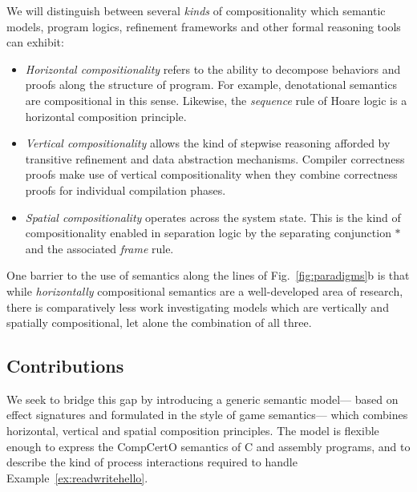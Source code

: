 \documentclass[acmsmall,nonacm]{acmart}
\begin{document}
We will distinguish between several \emph{kinds} of compositionality which
semantic models, program logics, refinement frameworks
and other formal reasoning tools
can exhibit:
\begin{itemize}
\item \emph{Horizontal compositionality}
  refers to the ability to decompose behaviors and proofs
  along the structure of program.
  For example, denotational semantics are compositional in this sense.
  Likewise,
  the \emph{sequence} rule of Hoare logic
  is a horizontal composition principle.
\item \emph{Vertical compositionality} allows
  the kind of stepwise reasoning afforded by
  transitive refinement and data abstraction mechanisms.
  Compiler correctness proofs make use of vertical compositionality
  when they combine correctness proofs for individual compilation phases.
\item \emph{Spatial compositionality} operates across the system state.
  This is the kind of compositionality enabled in separation logic
  by the separating conjunction $\ast$
  and the associated \emph{frame} rule.
\end{itemize}
One barrier to the use of semantics
along the lines of Fig.~\ref{fig:paradigms}b
is that while
\emph{horizontally} compositional semantics
are a well-developed area of research,
there is comparatively less work investigating models which are
vertically and spatially compositional,
let alone the combination of all three.


\subsection{Contributions} %

We seek to bridge this gap
by introducing a generic semantic model---%
based on effect signatures and formulated in the style of game semantics---%
which combines horizontal, vertical and spatial composition principles.
The model is flexible enough
to express the CompCertO semantics of C and assembly programs,
and to describe the kind of process interactions %
required to handle Example~\ref{ex:readwritehello}.
\end{document}
